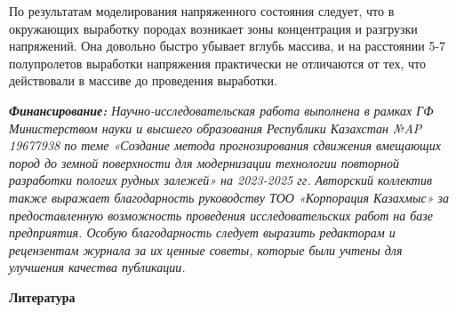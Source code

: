 \begin{multicols}{2}
По результатам моделирования напряженного состояния следует, что в
окружающих выработку породах возникает зоны концентрация и разгрузки
напряжений. Она довольно быстро убывает вглубь массива, и на расстоянии
5-7 полупролетов выработки напряжения практически не отличаются от тех,
что действовали в массиве до проведения выработки.

\emph{{\bfseries Финансирование:} Научно-исследовательская работа выполнена
в рамках ГФ Министерством науки и высшего образования Республики
Казахстан №AP 19677938 по теме «Создание метода прогнозирования
сдвижения вмещающих пород до земной поверхности для модернизации
технологии повторной разработки пологих рудных залежей» на 2023-2025 гг.
Авторский коллектив также выражает благодарность руководству ТОО
«Корпорация Казахмыс» за предоставленную возможность проведения
исследовательских работ на базе предприятия. Особую благодарность
следует выразить редакторам и рецензентам журнала за их ценные советы,
которые были учтены для улучшения качества публикации.}
\end{multicols}

\begin{center}
{\bfseries Литература}
\end{center}

